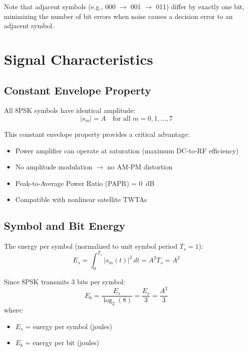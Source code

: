 Note that adjacent symbols (e.g., 000 $\rightarrow$ 001 $\rightarrow$ 011) differ by exactly one bit, minimizing the number of bit errors when noise causes a decision error to an adjacent symbol.

\section{Signal Characteristics}

\subsection{Constant Envelope Property}

All 8PSK symbols have identical amplitude:
\begin{equation}
|s_m| = A \quad \text{for all } m = 0, 1, \ldots, 7
\end{equation}

This constant envelope property provides a critical advantage:
\begin{itemize}
\item[\checkmark] Power amplifier can operate at saturation (maximum DC-to-RF efficiency)
\item[\checkmark] No amplitude modulation $\rightarrow$ no AM-PM distortion
\item[\checkmark] Peak-to-Average Power Ratio (PAPR) = 0~dB
\item[\checkmark] Compatible with nonlinear satellite TWTAs
\end{itemize}

\subsection{Symbol and Bit Energy}

The energy per symbol (normalized to unit symbol period $T_s = 1$):
\begin{equation}
E_s = \int_0^{T_s} |s_m(t)|^2 \, dt = A^2 T_s = A^2
\end{equation}

Since 8PSK transmits 3 bits per symbol:
\begin{equation}
E_b = \frac{E_s}{\log_2(8)} = \frac{E_s}{3} = \frac{A^2}{3}
\end{equation}
where:
\begin{itemize}
\item $E_s$ = energy per symbol (joules)
\item $E_b$ = energy per bit (joules)
\end{itemize}

